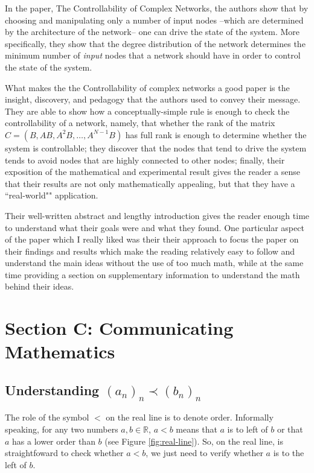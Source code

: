 \documentclass[11pt]{article}
\begin{document}
In the paper, The Controllability of Complex Networks, the authors show that by choosing and manipulating only a number of input nodes --which are determined by the architecture of the network-- one can drive the state of the system. More specifically, they show that the degree distribution of the network determines the minimum number of \textit{input} nodes that a network should have in order to control the state of the system.

What makes the the Controllability of complex networks a good paper is the insight, discovery, and pedagogy that the authors used to convey their message. They are able to show how a conceptually-simple rule is enough to check the controllability of a network, namely, that whether the rank of the matrix $C = (B, AB, A^2B, \ldots, A^{N-1}B)$  has full rank is enough to determine whether the system is controllable; they discover that the nodes that tend to drive the system tends to avoid nodes that are highly connected to other nodes; finally, their exposition of the mathematical and experimental result gives the reader a sense that their results are not only mathematically appealing, but that they have a ``real-world"" application.

Their well-written abstract and lengthy introduction gives the reader enough time to understand what their goals were and what they found. One particular aspect of the paper which I really liked was their their approach to focus the paper on their findings and results which make the reading relatively easy to follow and understand the main ideas without the use of too much math, while at the same time providing a section on supplementary information to understand the math behind their ideas.


\section*{Section C: Communicating Mathematics}

\subsection*{Understanding $(a_n)_n \prec (b_n)_n$}
The role of the symbol $<$ on the real line is to denote order. Informally speaking, for any two numbers $a, b \in \mathbb{R}$,  $a < b$ means that $a$ is to left of $b$ or that $a$ has a lower order than $b$ (see Figure \ref{fig:real-line}). So, on the real line, is straightfoward to check whether $a < b$, we just need to verify whether $a$ is to the left of $b$.
\end{document}

